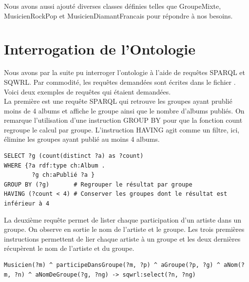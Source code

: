 \documentclass{article}
\begin{document}
Nous avons aussi ajouté diverses classes définies telles que \textsf{GroupeMixte}, \textsf{MusicienRockPop} et \textsf{MusicienDiamantFrancais} pour répondre à nos besoins.

\section{Interrogation de l'Ontologie}
Nous avons par la suite pu interroger l'ontologie à l'aide de requêtes SPARQL et SQWRL. Par commodité, les requêtes demandées sont écrites dans le fichier . Voici deux exemples de requêtes qui étaient demandées.\\

La première est une requête SPARQL qui retrouve les groupes ayant prublié moins de 4 albums et affiche le groupe ainsi que le nombre d'albums publiés. On remarque l'utilisation d'une instruction \textsf{GROUP BY} pour que la fonction \textsf{count} regroupe le calcul par groupe. L'instruction \textsf{HAVING} agit comme un filtre, ici, élimine les groupes ayant publié au moins 4 albums.

\begin{lstlisting}[H]
SELECT ?g (count(distinct ?a) as ?count)
WHERE {?a rdf:type ch:Album .
        ?g ch:aPublié ?a }
GROUP BY (?g)       # Regrouper le résultat par groupe
HAVING (?count < 4) # Conserver les groupes dont le résultat est inférieur à 4 
\end{lstlisting}

La deuxième requête permet de lister chaque participation d'un artiste dans un groupe. On observe en sortie le nom de l'artiste et le groupe. Les trois premières instructions permettent de lier chaque artiste à un groupe et les deux dernières récupèrent le nom de l'artiste et du groupe.

\begin{lstlisting}[H]
Musicien(?m) ^ participeDansGroupe(?m, ?p) ^ aGroupe(?p, ?g) ^ aNom(?m, ?n) ^ aNomDeGroupe(?g, ?ng) -> sqwrl:select(?n, ?ng)
\end{lstlisting}
\end{document}

